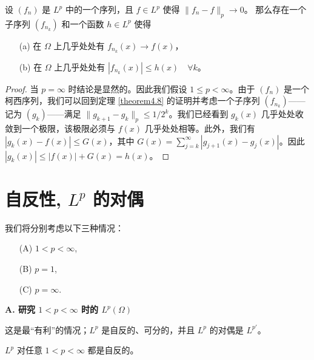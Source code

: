 \begin{theorem}\label{theorem4.9}
设 $(f_n)$ 是 $L^p$ 中的一个序列，且 $f \in L^p$ 使得 $\|f_n - f\|_p \to 0$。
那么存在一个子序列 $(f_{n_k})$ 和一个函数 $h \in L^p$ 使得
\begin{itemize}
    \item[(a)] 在 $\Omega$ 上几乎处处有 $f_{n_k}(x) \to f(x)$，
    \item[(b)] 在 $\Omega$ 上几乎处处有 $|f_{n_k}(x)| \le h(x) \quad \forall k$。
\end{itemize}
\end{theorem}
\begin{proof}
当 $p=\infty$ 时结论是显然的。因此我们假设 $1 \le p < \infty$。由于 $(f_n)$ 是一个柯西序列，我们可以回到定理 \ref{theorem4.8} 的证明并考虑一个子序列 $(f_{n_k})$——记为 $(g_k)$——满足 $\|g_{k+1} - g_k\|_p \le 1/2^k$。我们已经看到 $g_k(x)$ 几乎处处收敛到一个极限，该极限必须与 $f(x)$ 几乎处处相等。此外，我们有 $|g_k(x) - f(x)| \le G(x)$，其中 $G(x) = \sum_{j=k}^\infty |g_{j+1}(x) - g_j(x)|$。因此 $|g_k(x)| \le |f(x)| + G(x) = h(x)$。
\end{proof}

\section{自反性, $L^p$ 的对偶}

我们将分别考虑以下三种情况：
\begin{itemize}
    \item[(A)] $1 < p < \infty$,
    \item[(B)] $p=1$,
    \item[(C)] $p=\infty$.
\end{itemize}

\textbf{A. 研究 $1 < p < \infty$ 时的 $L^p(\Omega)$}

这是最“有利”的情况；$L^p$ 是自反的、可分的，并且 $L^p$ 的对偶是 $L^{p'}$。

\begin{theorem}\label{theorem4.10}
$L^p$ 对任意 $1 < p < \infty$ 都是自反的。
\end{theorem}

